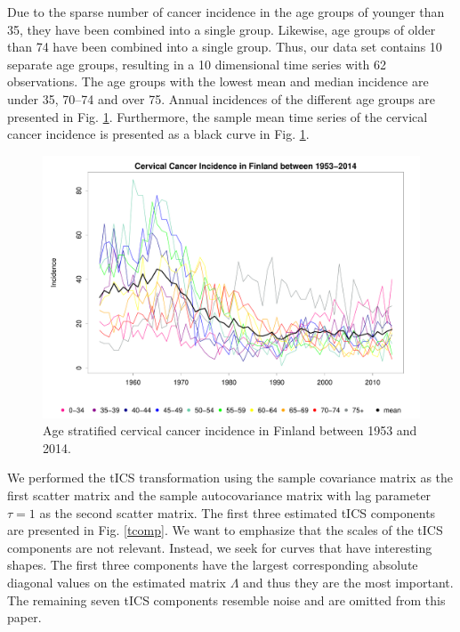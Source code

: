 \documentclass{llncs}
\begin{document}
Due to the sparse number of cancer incidence in the age groups of younger than 35,  they have been combined  into a single group. Likewise, age groups of older than 74 have been combined into a single group. Thus, our data set contains 10 separate age groups, resulting in a 10 dimensional time series with 62 observations. The age groups with the lowest mean and median incidence are under 35, 70--74 and over 75. Annual incidences of the different age groups  are  presented in Fig. \ref{p1b}. Furthermore, the sample mean time series of the cervical cancer incidence is presented as a black curve in Fig. \ref{p1b}.
\begin{figure}
   \centering
\includegraphics[width=0.823\linewidth]{cervicaloriginal.pdf}
\caption{Age stratified cervical cancer incidence in Finland between 1953 and 2014.}
\label{p1b}
\end{figure}

We performed the tICS transformation using the sample covariance matrix as the first scatter matrix and the sample autocovariance matrix with lag parameter $\tau=1$ as the second scatter matrix. 
The first three estimated tICS components are presented in Fig. \ref{tcomp}. We want to emphasize that the scales of the tICS components are not relevant. Instead, we seek for curves that have interesting shapes. The first three components have the largest corresponding absolute diagonal values on the estimated matrix $\Lambda$ and thus they are the most important. The remaining seven tICS components resemble noise and are omitted from this paper.

 
 
\end{document}
